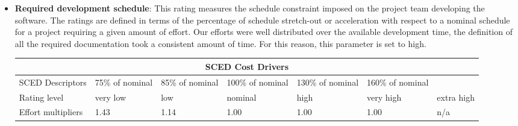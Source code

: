 \begin{itemize}
\item \textbf{Required development schedule}: This rating measures the schedule constraint imposed on the project team developing the software. The ratings are defined in terms of the percentage of schedule stretch-out or acceleration with respect to a nominal schedule for a project requiring a given amount of effort. Our efforts were well distributed over the available development time, the definition of all the required documentation took a consistent amount of time. For this reason, this parameter
is set to high.

\begin{longtable}{| m{}| m{} | m{} | m{} | m{} | m{} | m{}| }
\hline
\multicolumn{7}{c}{SCED Cost Drivers}\\
\hline
\hline
SCED Descriptors & 75\% of nominal & 85\% of nominal & 100\% of nominal & 130\% of nominal & 160\% of nominal  &  \\
\hline
Rating level & very low & low & nominal & high & very high & extra high \\
\hline
Effort multipliers & 1.43 & 1.14 & 1.00 & 1.00 & 1.00 & n/a \\
\hline
\end{longtable}

\end{itemize}

